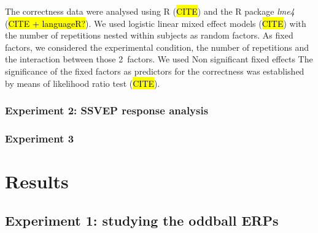 \documentclass[10pt]{article}
\begin{document}
        The correctness data were analysed using R (\hl{CITE}) and the R package \emph{lme4} (\hl{CITE + languageR?}).
        We used logistic linear mixed effect models (\hl{CITE}) with the number of repetitions nested within subjects as random factors.
        As fixed factors, we considered the experimental condition, the number of repetitions and the interaction between those 2~factors.
        We used
        Non significant fixed effects
        The significance of the fixed factors as predictors for the correctness was established by means of likelihood ratio test (\hl{CITE}).


        \subsubsection{Experiment 2: SSVEP response analysis}
        \label{sec:2.3.2AnalysisExp2}





        \subsubsection{Experiment 3}
        \label{sec:2.3.3AnalysisExp3}





\section{Results}
\label{sec:3Results}

    \subsection{Experiment 1: studying the oddball \acsp{ERP}}
    \label{sec:3.1Oddball}
\end{document}
